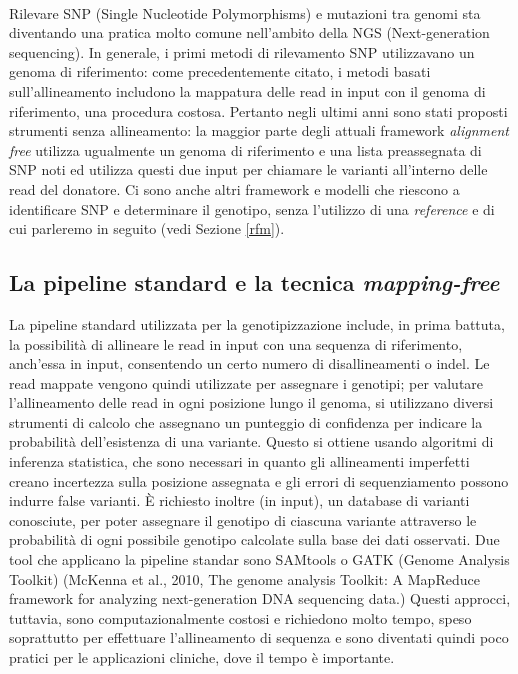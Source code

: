 \documentclass[../main.tex]{subfiles}
\begin{document}
\textcolor{OliveGreen}{\\ Rilevare SNP (Single Nucleotide Polymorphisms) e mutazioni tra genomi sta diventando una pratica molto comune nell'ambito della NGS (Next-generation sequencing). In generale, i primi metodi di rilevamento SNP utilizzavano un genoma di riferimento: come precedentemente citato, i metodi basati sull'allineamento includono la mappatura delle read in input con il genoma di riferimento, una procedura costosa. 
Pertanto negli ultimi anni sono stati proposti strumenti senza allineamento: la maggior parte degli attuali framework \textit{alignment free} utilizza ugualmente un genoma di riferimento e una lista preassegnata di SNP noti ed utilizza questi due input per chiamare le varianti all'interno delle read del donatore. Ci sono anche altri framework e modelli che riescono a identificare SNP e determinare il genotipo, senza l'utilizzo di una \textit{reference} e di cui parleremo in seguito (vedi Sezione \ref{rfm}).}


\subsection{La pipeline standard e la tecnica \textit{mapping-free}}


La pipeline standard utilizzata per la genotipizzazione include, in prima battuta, la possibilità di allineare le read in input con una sequenza di riferimento, anch'essa in input, consentendo un certo numero di disallineamenti o indel. Le read mappate vengono quindi utilizzate per assegnare i genotipi; per valutare l'allineamento delle read in ogni posizione lungo il genoma,  si utilizzano diversi strumenti di calcolo che assegnano un punteggio di confidenza per indicare la probabilità dell'esistenza di una variante. Questo si ottiene usando algoritmi di inferenza statistica, che sono necessari in quanto gli allineamenti imperfetti creano incertezza sulla posizione assegnata e gli errori di sequenziamento possono indurre false varianti. È richiesto inoltre \textcolor{OliveGreen}{(in input),} un database di varianti conosciute, per poter assegnare il genotipo di ciascuna variante attraverso le probabilità di ogni possibile genotipo calcolate sulla base dei dati osservati. Due tool che applicano la pipeline standar sono  SAMtools o GATK (Genome Analysis Toolkit) \textcolor{BurntOrange}{(McKenna et al., 2010, The genome analysis Toolkit: A MapReduce framework for analyzing next-generation DNA sequencing data.)} Questi approcci, tuttavia, sono computazionalmente costosi e richiedono molto tempo, speso soprattutto per effettuare l'allineamento di sequenza e sono diventati quindi poco pratici per le applicazioni cliniche, dove il tempo è importante. \\
\end{document}
